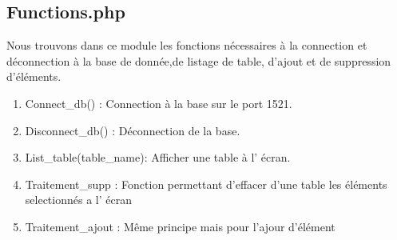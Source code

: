 \subsection{Functions.php}
Nous trouvons dans ce module les fonctions n\'ecessaires \`a la connection et d\'econnection \`a la base de donn\'ee,de listage de table, d'ajout et de suppression d'\'el\'ements.

\begin{enumerate}
\item Connect\_db() : Connection \`a la base sur le port 1521.
\item Disconnect\_db() : D\'econnection de la base.
\item List\_table(table\_name): Afficher une table \`a l' \'ecran.
\item Traitement\_supp : Fonction permettant d'effacer d'une table les \'el\'ements selectionn\'es a l' \'ecran
\item Traitement\_ajout : M\^eme principe mais pour l'ajour d'\'el\'ement
\end{enumerate}



\normalsize



\newpage